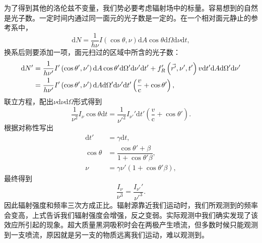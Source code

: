 \documentclass[../天体物理基础.tex]{subfiles}
\begin{document}
为了得到其他的洛伦兹不变量，我们势必要考虑辐射场中的标量。容易想到的自然是光子数。一定时间内通过同一面元的光子数是一定的。在一个相对面元静止的参考系中，
\begin{equation}
\mathrm{d}N=\frac{1}{h\nu}I\left(\cos\theta,\nu\right)\mathrm{d}A\cos\theta\mathrm{d}\Omega\mathrm{d}\nu \mathrm{d}t,
\end{equation}
换系后则要添加一项，面元扫过的区域中所含的光子数：
\begin{align}
\mathrm{d}N'&=\frac{1}{h\nu'}I'\left(\cos\theta',\nu'\right)\mathrm{d}A\cos\theta'\mathrm{d}\Omega'\mathrm{d}\nu' \mathrm{d}t'+f_{R}'\left(\vec{r'},\nu',t'\right)v\mathrm{d}t'\mathrm{d}A\mathrm{d}\Omega'\mathrm{d}\nu'\notag\\
&=\frac{1}{h\nu'}I'\left(\cos\theta',\nu'\right)\mathrm{d}A\mathrm{d}\Omega'\mathrm{d}\nu'\mathrm{d}t'\left(\frac{v}{\mathrm{c}}+\cos\theta'\right),
\end{align}
联立方程，配出$\nu\mathrm{d}\nu\mathrm{d}\Omega$形式得到
\begin{equation}
\frac{1}{\nu^2}I_{\nu}\cos\theta\mathrm{d}t=\frac{1}{\nu'^2}I_{\nu'}'\mathrm{d}t'\left(\frac{v}{\mathrm{c}}+\cos\theta'\right).
\end{equation}
根据对称性写出
\begin{align}
\mathrm{d}t'&=\gamma\mathrm{d}t,\\
\cos\theta&=\dfrac{\cos\theta'+\beta}{1+\cos\theta'\beta},\\
\nu&=\gamma\nu'\left(1+\cos\theta'\beta\right),
\end{align}
最终得到
\begin{equation}
\frac{I_{\nu}}{\nu^3}=\frac{I_{\nu'}'}{\nu'^3}.
\end{equation}
因此辐射强度和频率三次方成正比。辐射源靠近我们运动时，我们所观测到的频率会变高，上式告诉我们辐射强度会增强，反之变弱。实际观测中我们确实发现了该效应所引起的现象。超大质量黑洞吸积时会在两极产生喷流，但多数时候只能观测到一支喷流，原因就是另一支的物质远离我们运动，难以观测到。
\end{document}

